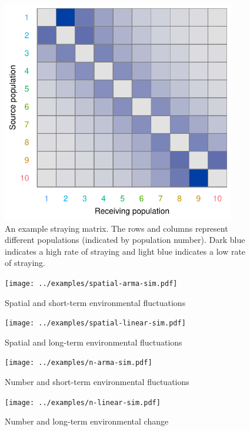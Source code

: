 \clearpage

\begin{figure}[htbp]
\centering
\includegraphics[width=4.0in]{../examples/figure/stray-matrix.pdf}
\caption{An example straying matrix. The rows and columns represent different 
populations (indicated by population number). Dark blue indicates a high rate 
of straying and light blue indicates a low rate of straying.}
\label{f:stray}
\end{figure}

\clearpage

\begin{figure}[htbp]
\centering
\texttt{[image: ../examples/spatial-arma-sim.pdf]}
\caption{Spatial and short-term environmental fluctuations}
\label{f:eg-sp-arma}
\end{figure}

\clearpage

\begin{figure}[htbp]
\centering
\texttt{[image: ../examples/spatial-linear-sim.pdf]}
\caption{Spatial and long-term environmental fluctuations}
\label{f:eg-sp-linear}
\end{figure}

\clearpage

\begin{figure}[htbp]
\centering
\texttt{[image: ../examples/n-arma-sim.pdf]}
\caption{Number and short-term environmental fluctuations}
\label{f:eg-n-arma}
\end{figure}

\clearpage

\begin{figure}[htbp]
\centering
\texttt{[image: ../examples/n-linear-sim.pdf]}
\caption{Number and long-term environmental change}
\label{f:eg-n-linear}
\end{figure}

\clearpage
